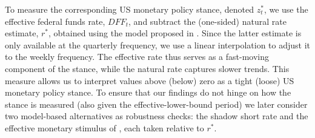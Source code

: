 
To measure the corresponding US monetary policy stance, denoted $z_t^\ast$, we use the effective federal funds rate, $DFF_t$, and subtract the (one-sided) natural rate estimate, $r^{\ast}$, obtained using the model proposed in \cite{laubach2003measuring}. Since the latter estimate is only available at the quarterly frequency, we use a linear interpolation to adjust it to the weekly frequency. The effective rate thus serves as a fast-moving component of the stance, while the natural rate captures slower trends. This measure allows us to interpret values above (below) zero as a tight (loose) US monetary policy stance. To ensure that our findings do not hinge on how the stance is measured (also given the effective-lower-bound period) we later consider two model-based alternatives as robustness checks: the shadow short rate and the effective monetary stimulus of \cite{krippner2016ems}, each taken relative to $r^{\ast}$.



